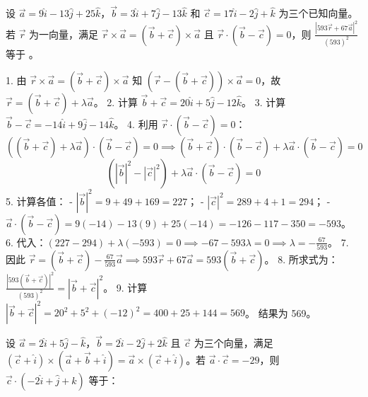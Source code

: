 \begin{questions}
\question
设 $\vec{a} = 9\hat{i} - 13\hat{j} + 25\hat{k}$，$\vec{b} = 3\hat{i} + 7\hat{j} - 13\hat{k}$ 和 $\vec{c} = 17\hat{i} - 2\hat{j} + \hat{k}$ 为三个已知向量。若 $\vec{r}$ 为一向量，满足 $\vec{r} \times \vec{a} = (\vec{b} + \vec{c}) \times \vec{a}$ 且 $\vec{r} \cdot (\vec{b} - \vec{c}) = 0$，则 $\frac{|593\vec{r} + 67\vec{a}|^2}{(593)^2}$ 等于 \underline{\quad}。

\begin{solution}
1. 由 $\vec{r} \times \vec{a} = (\vec{b} + \vec{c}) \times \vec{a}$ 知 $(\vec{r} - (\vec{b} + \vec{c})) \times \vec{a} = 0$，故 $\vec{r} = (\vec{b} + \vec{c}) + \lambda\vec{a}$。
2. 计算 $\vec{b} + \vec{c} = 20\hat{i} + 5\hat{j} - 12\hat{k}$。
3. 计算 $\vec{b} - \vec{c} = -14\hat{i} + 9\hat{j} - 14\hat{k}$。
4. 利用 $\vec{r} \cdot (\vec{b} - \vec{c}) = 0$：
\[ ((\vec{b} + \vec{c}) + \lambda\vec{a}) \cdot (\vec{b} - \vec{c}) = 0 \implies (\vec{b} + \vec{c}) \cdot (\vec{b} - \vec{c}) + \lambda \vec{a} \cdot (\vec{b} - \vec{c}) = 0 \]
\[ (|\vec{b}|^2 - |\vec{c}|^2) + \lambda \vec{a} \cdot (\vec{b} - \vec{c}) = 0 \]
5. 计算各值：
   - $|\vec{b}|^2 = 9 + 49 + 169 = 227$；
   - $|\vec{c}|^2 = 289 + 4 + 1 = 294$；
   - $\vec{a} \cdot (\vec{b} - \vec{c}) = 9(-14) - 13(9) + 25(-14) = -126 - 117 - 350 = -593$。
6. 代入：$(227 - 294) + \lambda(-593) = 0 \implies -67 - 593\lambda = 0 \implies \lambda = -\frac{67}{593}$。
7. 因此 $\vec{r} = (\vec{b} + \vec{c}) - \frac{67}{593}\vec{a} \implies 593\vec{r} + 67\vec{a} = 593(\vec{b} + \vec{c})$。
8. 所求式为：$\frac{|593(\vec{b} + \vec{c})|^2}{(593)^2} = |\vec{b} + \vec{c}|^2$。
9. 计算 $|\vec{b} + \vec{c}|^2 = 20^2 + 5^2 + (-12)^2 = 400 + 25 + 144 = 569$。
结果为 569。
\end{solution}

\question
设 $\vec{a} = 2\hat{i} + 5\hat{j} - \hat{k}$，$\vec{b} = 2\hat{i} - 2\hat{j} + 2\hat{k}$ 且 $\vec{c}$ 为三个向量，满足 $(\vec{c} + \hat{i}) \times (\vec{a} + \vec{b} + \hat{i}) = \vec{a} \times (\vec{c} + \hat{i})$。若 $\vec{a} \cdot \vec{c} = -29$，则 $\vec{c} \cdot (-2\hat{i} + \hat{j} + \hat{k})$ 等于：


\end{questions}
